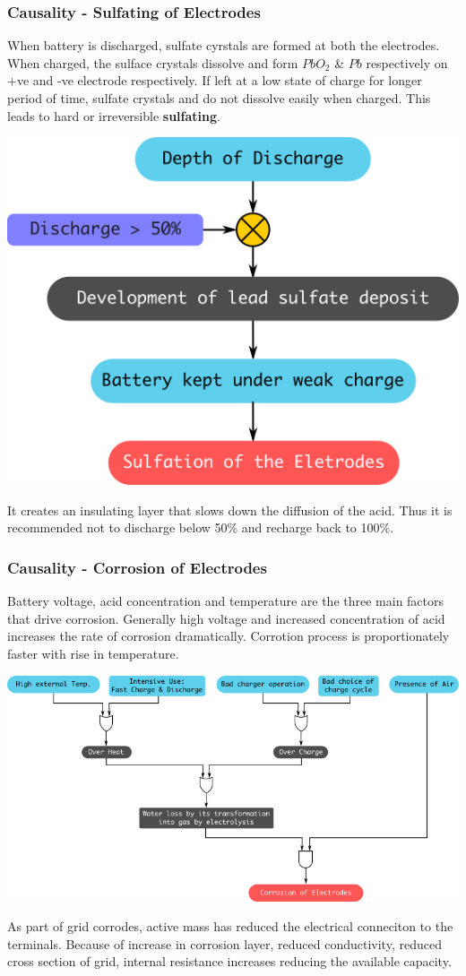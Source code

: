 \documentclass{beamer}
\begin{document}
\begin{frame}     %
  \frametitle{Causality - Sulfating of Electrodes}
  \fontsize{8pt}{12}\selectfont
  When battery is discharged, sulfate cyrstals are formed at both the electrodes. When charged, the sulface crystals dissolve and form $PbO_{2}$ \& $Pb$ respectively on +ve and -ve 
  electrode respectively. If left at a low state of charge for longer period of time, sulfate crystals and do not dissolve easily when charged. This leads to hard or irreversible 
  \textbf{sulfating}.
  \vspace{-10pt}
  \begin{center}
    \includegraphics[width=0.5\linewidth]{./Resources/Images/analysis_causality_sulfation.png}
  \end{center}

  It creates an insulating layer that slows down the diffusion of the acid. Thus it is recommended not to discharge below 50\% and recharge back to 100\%.
\end{frame}

\begin{frame}     %
  \frametitle{Causality - Corrosion of Electrodes}
  \fontsize{8pt}{12}\selectfont
  \vspace{-8pt}
  Battery voltage, acid concentration and temperature are the three main factors that drive corrosion. Generally high voltage and increased concentration of acid increases the rate of 
  corrosion dramatically. Corrotion process is proportionately faster with rise in temperature.
  \vspace{-5pt}
  \begin{center}
    \includegraphics[width=0.9\linewidth]{./Resources/Images/analysis_causality_corrosion.png}
  \end{center}
  \vspace{-8pt}
  As part of grid corrodes, active mass has reduced the electrical conneciton to the terminals. Because of increase in corrosion layer, reduced conductivity, reduced cross section of 
  grid, internal resistance increases reducing the available capacity.
\end{frame}
\end{document}
